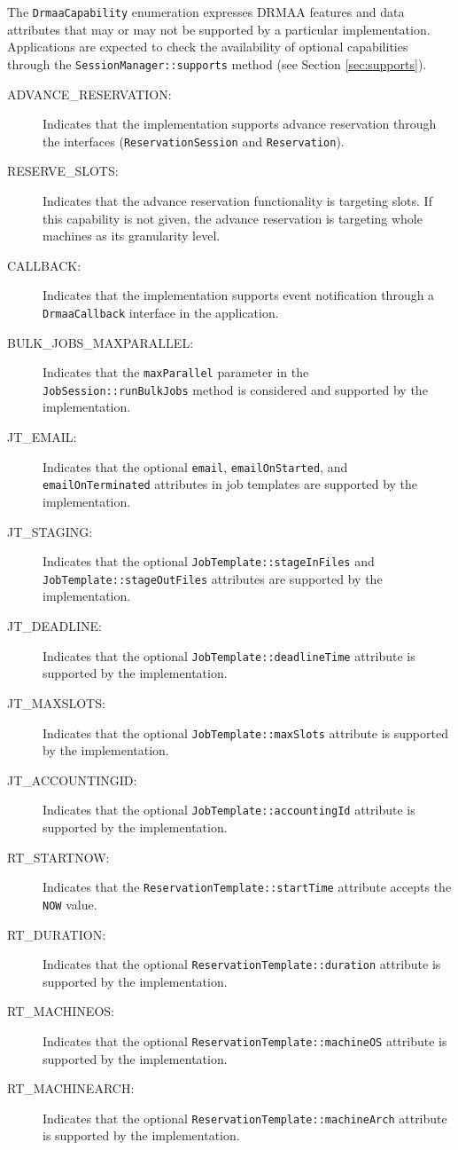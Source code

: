 \documentclass{article}
\newcommand{\h}[1]{\lstinline|#1|}
\begin{document}
The \h{DrmaaCapability} enumeration expresses DRMAA features and data attributes that may or may not be supported by a particular implementation. Applications are expected to check the availability of optional capabilities through the \h{SessionManager::supports} method (see Section \ref{sec:supports}).



\begin{description}
\item[ADVANCE\_RESERVATION:] Indicates that the implementation supports advance reservation through the interfaces (\h{ReservationSession} and \h{Reservation}).
\item[RESERVE\_SLOTS:] Indicates that the advance reservation functionality is targeting slots. If this capability is not given, the advance reservation is targeting whole machines as its granularity level.   
\item[CALLBACK:] Indicates that the implementation supports event notification through a \h{DrmaaCallback} interface in the application. 
\item[BULK\_JOBS\_MAXPARALLEL:] Indicates that the \h{maxParallel} parameter in the \h{JobSession::runBulkJobs} method is considered and supported by the implementation.
\item[JT\_EMAIL:] Indicates that the optional \h{email}, \h{emailOnStarted}, and \h{emailOnTerminated} attributes in job templates are supported by the implementation.
\item[JT\_STAGING:] Indicates that the optional \h{JobTemplate::stageInFiles} and \h{JobTemplate::stageOutFiles} attributes are supported by the implementation.
\item[ JT\_DEADLINE:] Indicates that the optional \h{JobTemplate::deadlineTime} attribute is supported by the implementation.
\item[ JT\_MAXSLOTS:] Indicates that the optional \h{JobTemplate::maxSlots} attribute is supported by the implementation.
\item[JT\_ACCOUNTINGID:] Indicates that the optional \h{JobTemplate::accountingId} attribute is supported by the implementation.
\item[RT\_STARTNOW:] Indicates that the \h{ReservationTemplate::startTime} attribute accepts the \h{NOW} value.
\item[RT\_DURATION:] Indicates that the optional \h{ReservationTemplate::duration} attribute is supported by the implementation.
\item[RT\_MACHINEOS:] Indicates that the optional \h{ReservationTemplate::machineOS} attribute is supported by the implementation.
\item[RT\_MACHINEARCH:] Indicates that the optional \h{ReservationTemplate::machineArch} attribute is supported by the implementation.
\end{description}
\end{document}
